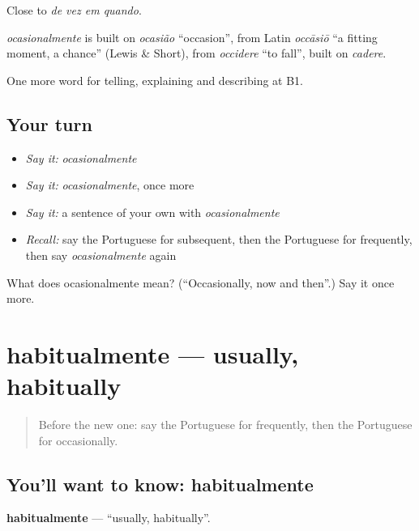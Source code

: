 Close to \emph{de vez em quando}.

\begin{cousinweb}
\emph{ocasionalmente} is built on \emph{ocasião} \textquotedblleft{}occasion\textquotedblright{}, from Latin \emph{occāsiō} \textquotedblleft{}a fitting moment, a chance\textquotedblright{} (Lewis \& Short), from \emph{occidere} \textquotedblleft{}to fall\textquotedblright{}, built on \emph{cadere}.
\end{cousinweb}

\begin{grammarlens}[title={What you've built}]
One more word for telling, explaining and describing at B1.
\end{grammarlens}

\subsection*{Your turn}
\begin{itemize}
\raggedright
  \item \emph{Say it:} \emph{ocasionalmente}
  \item \emph{Say it:} \emph{ocasionalmente}, once more
  \item \emph{Say it:} a sentence of your own with \emph{ocasionalmente}
  \item \emph{Recall:} say the Portuguese for subsequent, then the Portuguese for frequently, then say \emph{ocasionalmente} again
\end{itemize}

\begin{tcolorbox}[breakable,colback=teal!4,colframe=teal!35!black,title={Before you move on}]
What does ocasionalmente mean? (\textquotedblleft{}Occasionally, now and then\textquotedblright{}.) Say it once more.
\end{tcolorbox}
\section[habitualmente]{habitualmente — usually, habitually}

\label{lesson:PT-C277-habitualmente}



\begin{quote}
Before the new one: say the Portuguese for frequently, then the Portuguese for occasionally.
\end{quote}

\subsection*{You'll want to know: habitualmente}
\textbf{habitualmente} — \textquotedblleft{}usually, habitually\textquotedblright{}.

